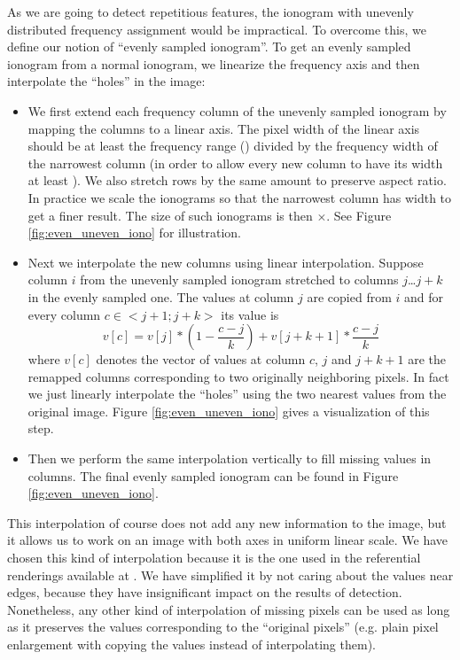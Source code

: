 As we are going to detect repetitious features, the ionogram with unevenly distributed frequency assignment would be impractical. To overcome this, we define our notion of ``evenly sampled ionogram''. To get an evenly sampled ionogram from a normal ionogram, we linearize the frequency axis and then interpolate the ``holes'' in the image:

\begin{itemize}
  \item We first extend each frequency column of the unevenly sampled ionogram by mapping the columns to a linear axis. The pixel width of the linear axis should be at least the frequency range () divided by the frequency width of the narrowest column (in order to allow every new column to have its width at least ). We also stretch rows by the same amount to preserve aspect ratio. In practice we scale the ionograms so that the narrowest column has width  to get a finer result. The size of such ionograms is then $\times$. See Figure \ref{fig:even_uneven_iono} for illustration.
  \item Next we interpolate the new columns using linear interpolation. Suppose column $i$ from the unevenly sampled ionogram stretched to columns $j$\ldots$j+k$ in the evenly sampled one. The values at column $j$ are copied from $i$ and for every column $c\in<j+1; j+k>$ its value is $$v[c] = v[j]*(1-\frac{c-j}{k}) + v[j+k+1]*\frac{c-j}{k}$$ where $v[c]$ denotes the vector of values at column $c$, $j$ and $j+k+1$ are the remapped columns corresponding to two originally neighboring pixels. In fact we just linearly interpolate the ``holes'' using the two nearest values from the original image. Figure \ref{fig:even_uneven_iono} gives a visualization of this step. 
  \item Then we perform the same interpolation vertically to fill missing values in columns. The final evenly sampled ionogram can be found in Figure \ref{fig:even_uneven_iono}.
\end{itemize}

This interpolation of course does not add any new information to the image, but it allows us to work on an image with both axes in uniform linear scale. We have chosen this kind of interpolation because it is the one used in the referential renderings available at \citep{FTP}. We have simplified it by not caring about the values near edges, because they have insignificant impact on the results of detection. Nonetheless, any other kind of interpolation of missing pixels can be used as long as it preserves the values corresponding to the ``original pixels'' (e.g. plain pixel enlargement with copying the values instead of interpolating them).

